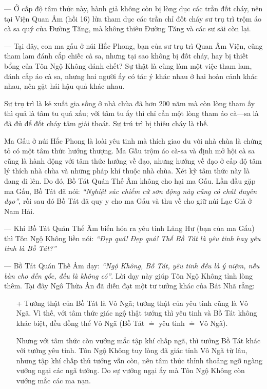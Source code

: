 — Ở cấp độ tâm thức này, hành giả không còn bị lòng dục các trần đốt cháy, nên tại Viện Quan Âm (hồi 16) lửa tham dục các trần chỉ đốt cháy sư trụ trì trộm áo cà sa quý của Đường Tăng, mà không thiêu Đường Tăng và các sư sãi còn lại.

— Tại đây, con ma gấu ở núi Hắc Phong, bạn của sư trụ trì Quan Âm Viện, cũng tham lam đánh cắp chiếc cà sa, nhưng tại sao không bị đốt cháy, hay bị thiết bổng của Tôn Ngộ Không đánh chết? Sự thật là cùng làm một việc tham lam, đánh cắp áo cà sa, nhưng hai người ấy có tác ý khác nhau ở hai hoàn cảnh khác nhau, nên gặt hái hậu quả khác nhau.

Sư trụ trì là kẻ xuất gia sống ở nhà chùa đã hơn 200 năm mà còn lòng tham ấy thì quả là tâm tu quá xấu; với tâm tu ấy thì chỉ cần một lòng tham áo cà—sa là đã đủ để đốt cháy tâm giải thoát. Sư trú trì bị thiêu cháy là thế.

Ma Gấu ở núi Hắc Phong là loài yêu tinh mà thích giao du với nhà chùa là chứng tỏ có một tâm thức hướng thượng. Ma Gấu trộm áo cà-sa và định mở hội cà sa cũng là hành động với tâm thức hướng về đạo, nhưng hướng về đạo ở cấp độ tâm lý thích nhà chùa và những pháp khí thuộc nhà chùa. Xét kỹ tâm thức này là đang đi lên. Do đó, Bồ Tát Quán Thế Âm không cho hại ma Gấu. Lần đầu gặp ma Gấu, Bồ Tát đã nói: \emph{``Nghiệt súc chiếm cứ sơn động này cũng có chút duyên đạo''}, rồi sau đó Bồ Tát đã quy y cho ma Gấu và thu về cho giữ núi Lạc Già ở Nam Hải.

— Khi Bồ Tát Quán Thế Âm biến hóa ra yêu tinh Lăng Hư (bạn của ma Gấu) thì Tôn Ngộ Không liền nói: \emph{``Đẹp quá! Đẹp quá! Thế Bồ Tát là yêu tinh hay yêu tinh là Bồ Tát?''}

— Bồ Tát Quán Thế Âm dạy: \emph{``Ngộ Không, Bồ Tát, yêu tinh đều là ý niệm, nếu bàn cho đến gốc, đều là không có''}. Lời dạy này giúp Tôn Ngộ Không tỉnh lòng thêm. Tại đây Ngô Thừa Ân đã diễn đạt một tư tưởng khác của Bát Nhã rằng:

\begin{enumerate}[label=\itshape\arabic*\upshape/]
    \item[+] Tướng thật của Bồ Tát là Vô Ngã; tướng thật của yêu tinh cũng là Vô Ngã. Vì thế, với tâm thức giác ngộ thật tướng thì yêu tinh và Bồ Tát không khác biệt, đều đồng thể Vô Ngã (Bồ Tát $\doteq$ yêu tinh $\doteq$ Vô Ngã).

    Nhưng với tâm thức còn vướng mắc tập khí chấp ngã, thì tướng Bồ Tát khác với tướng yêu tinh. Tôn Ngộ Không tuy lòng đã giác tỉnh Vô Ngã từ lâu, nhưng tập khí chấp thủ tướng vẫn còn, nên tâm thức thỉnh thoảng ngỡ ngàng vướng ngại các ngã tướng. Do sự vướng ngại ấy mà Tôn Ngộ Không còn vướng mắc các ma nạn.
\end{enumerate}

